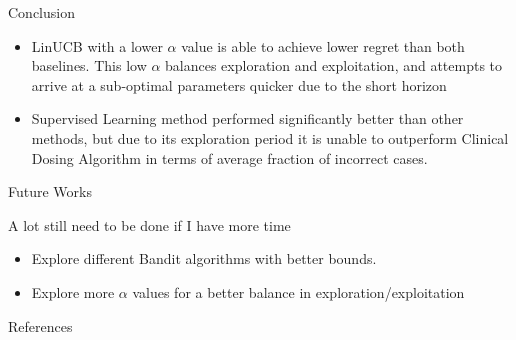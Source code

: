 \documentclass[final, 14pt]{beamer}
\newlength{\onecolwid}
\begin{document}
\begin{frame}[t]
\begin{columns}[t]
\begin{column}{\onecolwid}
\begin{block}{Conclusion}
\begin{itemize}
	\item LinUCB with a lower $\alpha$ value is able to achieve lower regret than both baselines. This low $\alpha$ balances exploration and exploitation, and attempts to arrive at a sub-optimal parameters quicker due to the short horizon
	\item Supervised Learning method performed significantly better than other methods, but due to its exploration period it is unable to outperform Clinical Dosing Algorithm in terms of average fraction of incorrect cases.
\end{itemize}
\end{block}


\begin{block}{Future Works}

A lot still need to be done if I have more time
\begin{itemize}
\item Explore different Bandit algorithms with better bounds.
\item Explore more $\alpha$ values for a better balance in exploration/exploitation
\end{itemize}

\end{block}


\begin{block}{References}

\nocite{*} %
\small{
\vspace{0.5in}}

\end{block}




\end{column}
\end{columns}
\end{frame}
\end{document}
